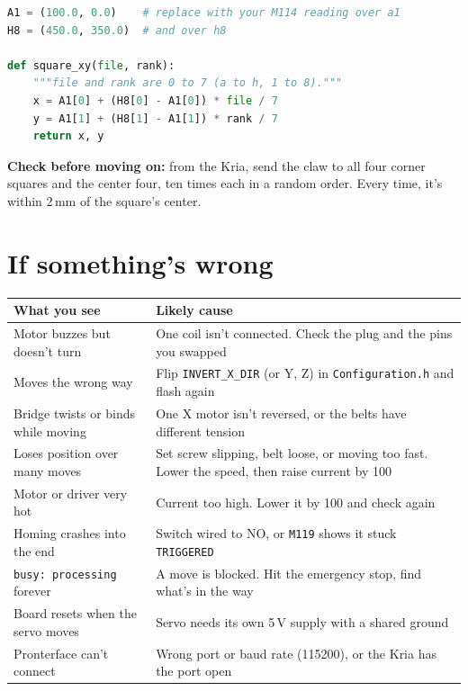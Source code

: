 \documentclass[10pt]{article}
\newcommand{\mm}{\,mm}
\newcommand{\file}[1]{\texttt{#1}}
\newcommand{\gcode}[1]{\texttt{#1}}
\newcommand{\gate}[1]{\par\smallskip\noindent\colorbox{okgreen!10}{\parbox{\dimexpr\linewidth-2\fboxsep}{\textcolor{okgreen}{\textbf{Check before moving on:}} #1}}\par\smallskip}
\begin{document}
\begin{lstlisting}[language=Python]
A1 = (100.0, 0.0)    # replace with your M114 reading over a1
H8 = (450.0, 350.0)  # and over h8

def square_xy(file, rank):
    """file and rank are 0 to 7 (a to h, 1 to 8)."""
    x = A1[0] + (H8[0] - A1[0]) * file / 7
    y = A1[1] + (H8[1] - A1[1]) * rank / 7
    return x, y
\end{lstlisting}

\gate{from the Kria, send the claw to all four corner squares and the center four, ten times
each in a random order. Every time, it's within 2\mm{} of the square's center.}

\section{If something's wrong}

\begin{tabularx}{\textwidth}{l L}
\toprule
What you see & Likely cause \\
\midrule
Motor buzzes but doesn't turn & One coil isn't connected. Check the plug and the pins you swapped \\
Moves the wrong way & Flip \texttt{INVERT\_X\_DIR} (or Y, Z) in \file{Configuration.h} and flash again \\
Bridge twists or binds while moving & One X motor isn't reversed, or the belts have different tension \\
Loses position over many moves & Set screw slipping, belt loose, or moving too fast. Lower the speed, then raise current by 100 \\
Motor or driver very hot & Current too high. Lower it by 100 and check again \\
Homing crashes into the end & Switch wired to NO, or \gcode{M119} shows it stuck \texttt{TRIGGERED} \\
\texttt{busy: processing} forever & A move is blocked. Hit the emergency stop, find what's in the way \\
Board resets when the servo moves & Servo needs its own 5\,V supply with a shared ground \\
Pronterface can't connect & Wrong port or baud rate (115200), or the Kria has the port open \\
\bottomrule
\end{tabularx}
\end{document}
